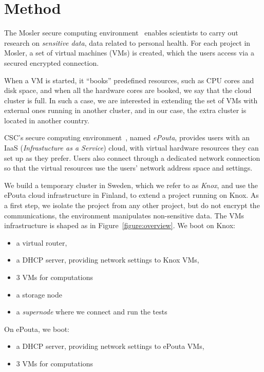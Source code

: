 \section{Method}
\label{section:method}

The Mosler secure computing environment~\cite{mosler} enables
scientists to carry out research on \emph{sensitive data}, \eg data
related to personal health.
%
For each project in Mosler, a set of virtual machines (VMs) is
created, which the users access via a secured encrypted connection.

When a VM is started, it ``books'' predefined resources, such as CPU
cores and disk space, and when all the hardware cores are booked, we
say that the cloud cluster is full. In such a case, we are interested
in extending the set of VMs with external ones running in another
cluster, and in our case, the extra cluster is located in another
country.

CSC's secure computing environment~\cite{epouta}, named \emph{ePouta},
provides users with an IaaS (\emph{Infrastucture as a Service}) cloud,
\ie with virtual hardware resources they can set up as they
prefer. Users also connect through a dedicated network connection so
that the virtual resources use the users' network address space and
settings.

\begin{figure*}%
  \centering
  
  \caption{Overview of the project resources}
  \label{figure:overview}
\end{figure*}

We build a temporary cluster in Sweden, which we refer to as
\emph{Knox}, and use the ePouta cloud infrastructure in Finland, to
extend a project running on Knox. As a first step, we isolate the
project from any other project, but do not encrypt the communications,
\ie the environment manipulates non-sensitive data.
%
The VMs infrastructure is shaped as in
Figure~\ref{figure:overview}. We boot on Knox:
\begin{itemize}
\item a virtual router,
\item a DHCP server, providing network settings to Knox VMs,
\item 3 VMs for computations
\item a storage node
\item a \emph{supernode} where we connect and run the tests
\end{itemize}
On ePouta, we boot:
\begin{itemize}
\item a DHCP server, providing network settings to ePouta VMs,
\item 3 VMs for computations
\end{itemize}

